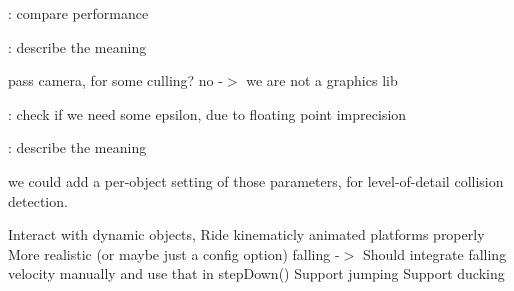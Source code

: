 \begin{DoxyRefList}
%
\+: compare performance  
\item[Class \doxylink{classbt_collision_configuration}{bt\+Collision\+Configuration} ]\label{todo__todo000010}%
%
\+: describe the meaning  
\item[Member \doxylink{classbt_collision_world_ac1ca6489c220005798069152c3df0d08}{bt\+Collision\+World\+::debug\+Draw\+Object} (const bt\+Transform \&world\+Transform, const bt\+Collision\+Shape \texorpdfstring{$\ast$}{*}shape, const bt\+Vector3 \&color)]\label{todo__todo000011}%
%
pass camera, for some culling? no -\/\texorpdfstring{$>$}{>} we are not a graphics lib  
\item[Member \doxylink{structbt_connectivity_processor_a5d5f11a5ad2bc3b3bfad6882b42e18de}{bt\+Connectivity\+Processor\+::process\+Triangle} (bt\+Vector3 \texorpdfstring{$\ast$}{*}triangle, int part\+Id, int triangle\+Index)]\label{todo__todo000014}%
%
\+: check if we need some epsilon, due to floating point imprecision  
\item[Class \doxylink{classbt_default_collision_configuration}{bt\+Default\+Collision\+Configuration} ]\label{todo__todo000012}%
%
\+: describe the meaning  
\item[Member \doxylink{classbt_default_collision_configuration_a39a173eedf0e8d55dd89ef3b637925a9}{bt\+Default\+Collision\+Configuration\+::set\+Convex\+Convex\+Multipoint\+Iterations} (int num\+Perturbation\+Iterations=3, int minimum\+Points\+Perturbation\+Threshold=3)]\label{todo__todo000013}%
%
we could add a per-\/object setting of those parameters, for level-\/of-\/detail collision detection.  
\item[Class \doxylink{classbt_kinematic_closest_not_me_ray_result_callback}{bt\+Kinematic\+Closest\+Not\+Me\+Ray\+Result\+Callback} ]\label{todo__todo000027}%
%
Interact with dynamic objects, Ride kinematicly animated platforms properly More realistic (or maybe just a config option) falling -\/\texorpdfstring{$>$}{>} Should integrate falling velocity manually and use that in step\+Down() Support jumping Support ducking  
\item[Member \doxylink{classbt_manifold_result_aebe32f0c202d988d0458e88d768602c6}{bt\+Manifold\+Result\+::add\+Contact\+Point} (const bt\+Vector3 \&normal\+On\+BIn\+World, const bt\+Vector3 \&point\+In\+World, bt\+Scalar depth)]\label{todo__todo000015}%
%

\end{DoxyRefList}
